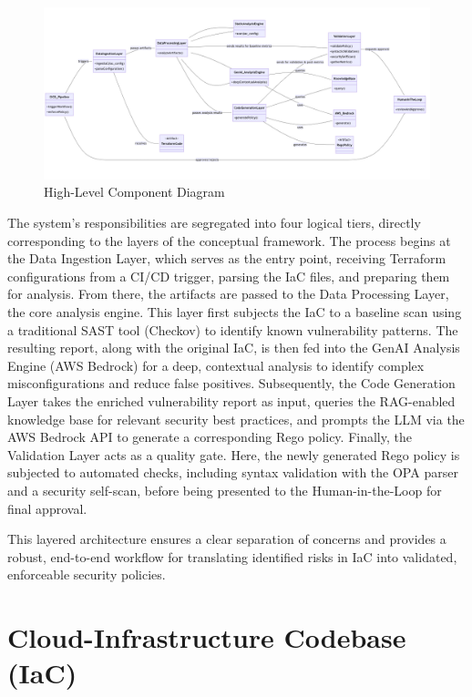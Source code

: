 \begin{figure}[h!]
\centering
\includegraphics[width=\textwidth]{Figures/diagramm.png}
\caption{High-Level Component Diagram}
\label{fig:component_diagram}
\end{figure}

The system's responsibilities are segregated into four logical tiers, directly corresponding to the layers of the conceptual framework. The process begins at the Data Ingestion Layer, which serves as the entry point, receiving Terraform configurations from a CI/CD trigger, parsing the IaC files, and preparing them for analysis. From there, the artifacts are passed to the Data Processing Layer, the core analysis engine. This layer first subjects the IaC to a baseline scan using a traditional SAST tool (Checkov) to identify known vulnerability patterns. The resulting report, along with the original IaC, is then fed into the GenAI Analysis Engine (AWS Bedrock) for a deep, contextual analysis to identify complex misconfigurations and reduce false positives. Subsequently, the Code Generation Layer takes the enriched vulnerability report as input, queries the RAG-enabled knowledge base for relevant security best practices, and prompts the LLM via the AWS Bedrock API to generate a corresponding Rego policy. Finally, the Validation Layer acts as a quality gate. Here, the newly generated Rego policy is subjected to automated checks, including syntax validation with the OPA parser and a security self-scan, before being presented to the Human-in-the-Loop for final approval.

This layered architecture ensures a clear separation of concerns and provides a robust, end-to-end workflow for translating identified risks in IaC into validated, enforceable security policies.

\section{Cloud-Infrastructure Codebase (IaC)}

